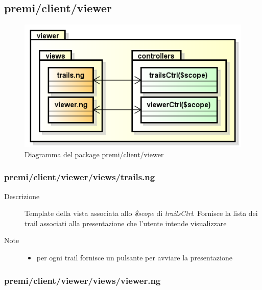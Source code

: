 \clearpage
\subsection{premi/client/viewer}
\begin{figure}[h]
\begin{center}
\includegraphics[scale=0.55]{img/diapkg/viewer.png}
\caption{Diagramma del package premi/client/viewer}
\end{center}
\end{figure}


\subsubsection{premi/client/viewer/views/trails.ng}

\begin{description}
\item[Descrizione] \hfill
	Template della vista associata allo \textit{\$scope} di \textit{trailsCtrl}. Fornisce la lista dei trail associati alla presentazione che l'utente intende visualizzare
\item[Note] \hfill
	\begin{itemize}
			\item per ogni trail fornisce un pulsante per avviare la presentazione
	\end{itemize}
\end{description}

\subsubsection{premi/client/viewer/views/viewer.ng}

